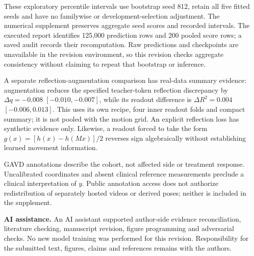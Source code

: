 \documentclass{article}
\begin{document}
These exploratory percentile intervals use bootstrap seed 812, retain
all five fitted seeds and have no familywise or development-selection
adjustment. The numerical supplement preserves aggregate seed scores and
recorded intervals. The executed report identifies 125,000 prediction
rows and 200 pooled score rows; a saved audit records their
recomputation. Raw predictions and checkpoints are unavailable in the
revision environment, so this revision checks aggregate consistency
without claiming to repeat that bootstrap or inference.

A separate reflection-augmentation comparison has real-data summary
evidence: augmentation reduces the specified teacher-token reflection
discrepancy by \(\Delta q=-0.008\) \([-0.010,-0.007]\), while its
readout difference is \(\Delta R^2=0.004\) \([-0.006,0.013]\). This uses
its own recipe, four inner readout folds and compact summary; it is not
pooled with the motion grid. An explicit reflection loss has synthetic
evidence only. Likewise, a readout forced to take the form
\(g(x)=[h(x)-h(Mx)]/2\) reverses sign algebraically without establishing
learned movement information.

GAVD annotations describe the cohort, not affected side or treatment
response. Uncalibrated coordinates and absent clinical reference
measurements preclude a clinical interpretation of \(y\). Public
annotation access does not authorize redistribution of separately hosted
videos or derived poses; neither is included in the supplement.

\textbf{AI assistance.} An AI assistant supported author-side evidence
reconciliation, literature checking, manuscript revision, figure
programming and adversarial checks. No new model training was performed
for this revision. Responsibility for the submitted text, figures,
claims and references remains with the authors.
\end{document}
